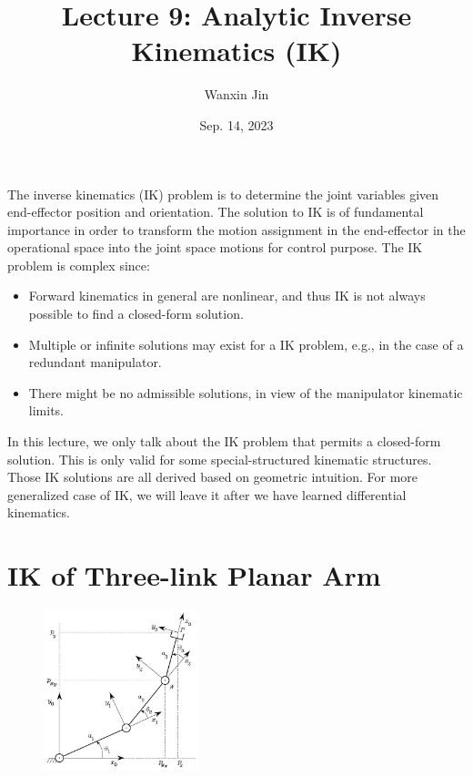\documentclass[10pt]{article}
\begin{document}
\title{Lecture 9:  Analytic Inverse Kinematics (IK)}
\date{Sep. 14, 2023 }
\author{Wanxin Jin}
\maketitle



The inverse kinematics (IK) problem is to determine the joint variables given end-effector position and orientation. The solution to IK is of fundamental importance in order to transform the motion assignment in the end-effector in the operational space into the  joint space motions for control purpose.
The IK problem is  complex since:

\begin{itemize}
  \item Forward kinematics  in general are nonlinear, and thus IK is not always possible to find a closed-form solution.

  \item Multiple or infinite solutions may exist for a IK problem, e.g., in the case of a  redundant manipulator.

  \item There might be no admissible solutions, in view of the manipulator kinematic limits.

\end{itemize}

In this lecture, we only talk about the IK problem that permits a closed-form solution. This is only valid for some special-structured kinematic structures. Those IK solutions are all derived based on geometric intuition. For more generalized case of IK, we will leave it after we have learned differential kinematics.

\section{IK of Three-link Planar Arm}



\begin{figure}[H]
    \centering
   \includegraphics[max width=0.40\textwidth]{./kinematics/3link_arm}
    \label{c1.l2.three-link-robot-arm}
\end{figure}
\end{document}
